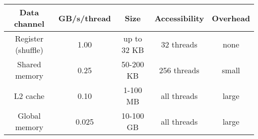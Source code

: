 \begin{tabular}{c c c c c}
	Data channel  & GB/s/thread & Size & Accessibility & Overhead \\
  \hline
	Register (shuffle) & 1.00  & up to 32 KB & 32 threads  & none \\
	Shared memory      & 0.25  & 50-200 KB   & 256 threads & small \\
	L2 cache           & 0.10  & 1-100 MB    & all threads & large \\
	Global memory      & 0.025 & 10-100 GB   & all threads & large \\
\end{tabular}
